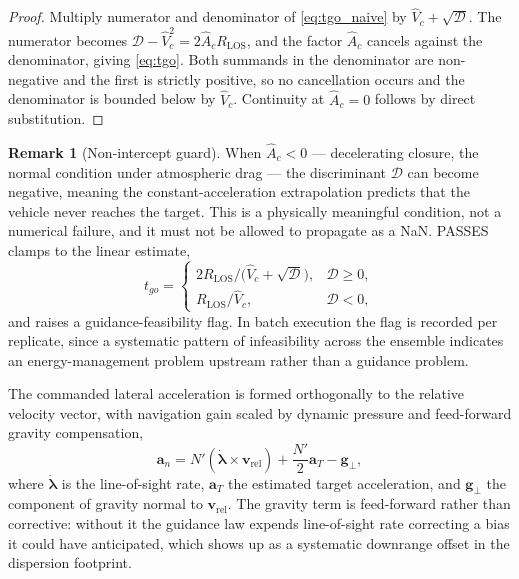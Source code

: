 \documentclass[11pt,a4paper]{article}
\theoremstyle{definition}
\newtheorem{remark}[theorem]{Remark}
\numberwithin{equation}{section}
\begin{document}
\begin{proof}
Multiply numerator and denominator of \cref{eq:tgo_naive} by $\hat{V}_c + \sqrt{\mathcal{D}}$. The numerator becomes $\mathcal{D} - \hat{V}_c^2 = 2\hat{A}_c R_{\text{LOS}}$, and the factor $\hat{A}_c$ cancels against the denominator, giving \cref{eq:tgo}. Both summands in the denominator are non-negative and the first is strictly positive, so no cancellation occurs and the denominator is bounded below by $\hat{V}_c$. Continuity at $\hat{A}_c = 0$ follows by direct substitution.
\end{proof}

\begin{remark}[Non-intercept guard]
\label{rem:guard}
When $\hat{A}_c < 0$ --- decelerating closure, the normal condition under atmospheric drag --- the discriminant $\mathcal{D}$ can become negative, meaning the constant-acceleration extrapolation predicts that the vehicle never reaches the target. This is a physically meaningful condition, not a numerical failure, and it must not be allowed to propagate as a NaN. PASSES clamps to the linear estimate,
\[
t_{go} = \begin{cases}
2 R_{\text{LOS}} \big/ \big(\hat{V}_c + \sqrt{\mathcal{D}}\big), & \mathcal{D} \ge 0, \\[4pt]
R_{\text{LOS}} / \hat{V}_c, & \mathcal{D} < 0,
\end{cases}
\]
and raises a guidance-feasibility flag. In batch execution the flag is recorded per replicate, since a systematic pattern of infeasibility across the ensemble indicates an energy-management problem upstream rather than a guidance problem.
\end{remark}

The commanded lateral acceleration is formed orthogonally to the relative velocity vector, with navigation gain scaled by dynamic pressure and feed-forward gravity compensation,
\begin{equation}
\label{eq:apn}
\mathbf{a}_n = N' \left( \dot{\bm{\lambda}} \times \mathbf{v}_{\text{rel}} \right) + \frac{N'}{2} \mathbf{a}_T - \mathbf{g}_{\perp},
\end{equation}
where $\dot{\bm{\lambda}}$ is the line-of-sight rate, $\mathbf{a}_T$ the estimated target acceleration, and $\mathbf{g}_\perp$ the component of gravity normal to $\mathbf{v}_{\text{rel}}$. The gravity term is feed-forward rather than corrective: without it the guidance law expends line-of-sight rate correcting a bias it could have anticipated, which shows up as a systematic downrange offset in the dispersion footprint.
\end{document}
